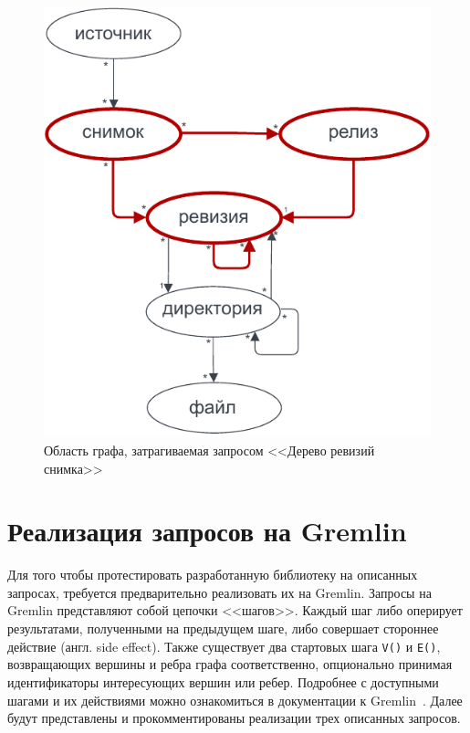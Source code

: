 \documentclass[times,specification,annotation]{itmo-student-thesis}
\begin{document}
\begin{figure}[!h]
\caption{Область графа, затрагиваемая запросом <<Дерево ревизий снимка>>}\label{snp-graph}
\centering
\includegraphics{img/snp-graph.pdf}
\end{figure}

\section{Реализация запросов на Gremlin}

Для того чтобы протестировать разработанную библиотеку на описанных запросах, требуется предварительно реализовать их на Gremlin. Запросы на Gremlin представляют собой цепочки <<шагов>>. Каждый шаг либо оперирует результатами, полученными на предыдущем шаге, либо совершает стороннее действие (англ. side effect). Также существует два стартовых шага \texttt{V()} и \texttt{E()}, возвращающих вершины и ребра графа соответственно, опционально принимая идентификаторы интересующих вершин или ребер. Подробнее с доступными шагами и их действиями можно ознакомиться в документации к Gremlin~\cite{gremlin-steps}. Далее будут представлены и прокомментированы реализации трех описанных запросов.
\end{document}
